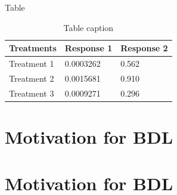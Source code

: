 \documentclass[aspectratio=169,xcolor=dvipsnames, t]{beamer}
\let\oldsection\section
\renewcommand{\section}[2][\relax]{%
    \ifx#1\relax
      \oldsection{#2}%
    \else
      \oldsection[#1]{#2}%
    \fi%
    \label{sec:\thesection}%
}
\begin{document}
\begin{frame}{Table}
    \begin{table}
        \begin{tabular}{l l l}
            \toprule
            \textbf{Treatments} & \textbf{Response 1} & \textbf{Response 2} \\
            \midrule
            Treatment 1         & 0.0003262           & 0.562               \\
            Treatment 2         & 0.0015681           & 0.910               \\
            Treatment 3         & 0.0009271           & 0.296               \\
            \bottomrule
        \end{tabular}
        \caption{Table caption}
    \end{table}
\end{frame}



\section{Motivation for BDL}
\end{document}
